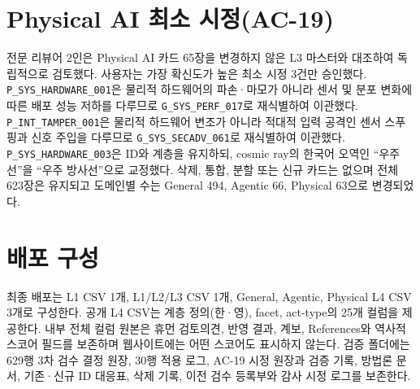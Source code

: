 \documentclass[11pt,a4paper]{article}
\begin{document}
\par\section{Physical AI 최소 시정(AC-19)}
전문 리뷰어 2인은 Physical AI 카드 65장을 변경하지 않은 L3 마스터와 대조하여 독립적으로 검토했다. 사용자는 가장 확신도가 높은 최소 시정 3건만 승인했다. \texttt{P\_SYS\_HARDWARE\_001}은 물리적 하드웨어의 파손·마모가 아니라 센서 및 분포 변화에 따른 배포 성능 저하를 다루므로 \texttt{G\_SYS\_PERF\_017}로 재식별하여 이관했다. \texttt{P\_INT\_TAMPER\_001}은 물리적 하드웨어 변조가 아니라 적대적 입력 공격인 센서 스푸핑과 신호 주입을 다루므로 \texttt{G\_SYS\_SECADV\_061}로 재식별하여 이관했다. \texttt{P\_SYS\_HARDWARE\_003}은 ID와 계층을 유지하되, cosmic ray의 한국어 오역인 ``우주선''을 ``우주 방사선''으로 교정했다. 삭제, 통합, 분할 또는 신규 카드는 없으며 전체 623장은 유지되고 도메인별 수는 General 494, Agentic 66, Physical 63으로 변경되었다.
\par\section{배포 구성}
최종 배포는 L1 CSV 1개, L1/L2/L3 CSV 1개, General, Agentic, Physical L4 CSV 3개로 구성한다. 공개 L4 CSV는 계층 정의(한·영), facet, act-type의 25개 컬럼을 제공한다. 내부 전체 컬럼 원본은 휴먼 검토의견, 반영 결과, 계보, References와 역사적 스코어 필드를 보존하며 웹사이트에는 어떤 스코어도 표시하지 않는다. 검증 폴더에는 629행 3차 검수 결정 원장, 30행 적용 로그, AC-19 시정 원장과 검증 기록, 방법론 문서, 기존·신규 ID 대응표, 삭제 기록, 이전 검수 등록부와 감사 시정 로그를 보존한다.
\end{document}
